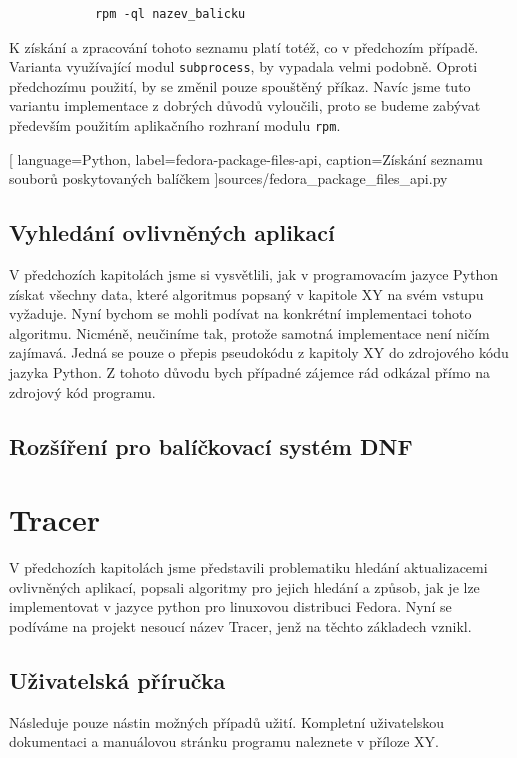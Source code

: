 \documentclass[
  field=inf,
  biblatex,
  glossaries,
  index
]{kidiplom}
\begin{document}
		\begin{lstlisting}
			rpm -ql nazev_balicku
		\end{lstlisting}

		K získání a zpracování tohoto seznamu platí totéž, co v předchozím případě. Varianta využívající modul \texttt{subprocess}, by vypadala velmi podobně. Oproti předchozímu použití, by se změnil pouze spouštěný příkaz. Navíc jsme tuto variantu implementace z dobrých důvodů vyloučili, proto se budeme zabývat především použitím aplikačního rozhraní modulu \texttt{rpm}.

		
		[
			language=Python,
			label=fedora-package-files-api,
			caption={Získání seznamu souborů poskytovaných balíčkem}
		]{sources/fedora_package_files_api.py}

	\subsection{Vyhledání ovlivněných aplikací}
		V předchozích kapitolách jsme si vysvětlili, jak v programovacím jazyce Python získat všechny data, které algoritmus popsaný v kapitole XY na svém vstupu vyžaduje. Nyní bychom se mohli podívat na konkrétní implementaci tohoto algoritmu. Nicméně, neučiníme tak, protože samotná implementace není ničím zajímavá. Jedná se pouze o přepis pseudokódu z kapitoly XY do zdrojového kódu jazyka Python. Z tohoto důvodu bych případné zájemce rád odkázal přímo na zdrojový kód programu.

	\subsection{Rozšíření pro balíčkovací systém DNF}
\newpage
\section{Tracer}
	V předchozích kapitolách jsme představili problematiku hledání aktualizacemi ovlivněných aplikací, popsali algoritmy pro jejich hledání a způsob, jak je lze implementovat v jazyce python pro linuxovou distribuci Fedora. Nyní se podíváme na projekt nesoucí název Tracer, jenž na těchto základech vznikl.
	\subsection{Uživatelská příručka}
		Následuje pouze nástin možných případů užití. Kompletní uživatelskou dokumentaci a manuálovou stránku programu naleznete v příloze XY.
\end{document}
